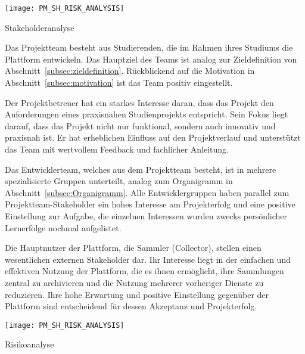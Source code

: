 \begin{table}[h!]
    \centering
    \texttt{[image: PM\_SH\_RISK\_ANALYSIS]}
    \caption{Stakeholderanalyse}\label{tab:stakeholderanalyse}
\end{table}

Das Projektteam besteht aus Studierenden, die im Rahmen ihres Studiums die Plattform entwickeln.
Das Hauptziel des Teams ist analog zur Zieldefinition von Abschnitt~\ref{subsec:zieldefinition}.
Rückblickend auf die Motivation in Abschnitt~\ref{subsec:motivation} ist das Team positiv eingestellt. \par

Der Projektbetreuer hat ein starkes Interesse daran, dass das Projekt den Anforderungen eines praxisnahen Studienprojekts entspricht.
Sein Fokus liegt darauf, dass das Projekt nicht nur funktional, sondern auch innovativ und praxisnah ist.
Er hat erheblichen Einfluss auf den Projektverlauf und unterstützt das Team mit wertvollem Feedback und fachlicher Anleitung. \par

Das Entwicklerteam, welches aus dem Projektteam besteht, ist in mehrere spezialisierte Gruppen unterteilt, analog zum Organigramm in Abschnitt~\ref{subsec:Organigramm}.
Alle Entwicklergruppen haben parallel zum Projektteam-Stakeholder ein hohes Interesse am Projekterfolg und eine positive Einstellung zur Aufgabe, die einzelnen Interessen wurden zwecks persönlicher Lernerfolge nochmal aufgelistet. \par

Die Hauptnutzer der Plattform, die Sammler (Collector), stellen einen wesentlichen externen Stakeholder dar.
Ihr Interesse liegt in der einfachen und effektiven Nutzung der Plattform, die es ihnen ermöglicht, ihre Sammlungen zentral zu archivieren und die Nutzung mehrerer vorheriger Dienste zu reduzieren.
Ihre hohe Erwartung und positive Einstellung gegenüber der Plattform sind entscheidend für dessen Akzeptanz und Projekterfolg. \par


\begin{table}[h!]
    \centering
    \texttt{[image: PM\_SH\_RISK\_ANALYSIS]}
    \caption{Risikoanalyse}\label{tab:risikoanalyse}
\end{table}


